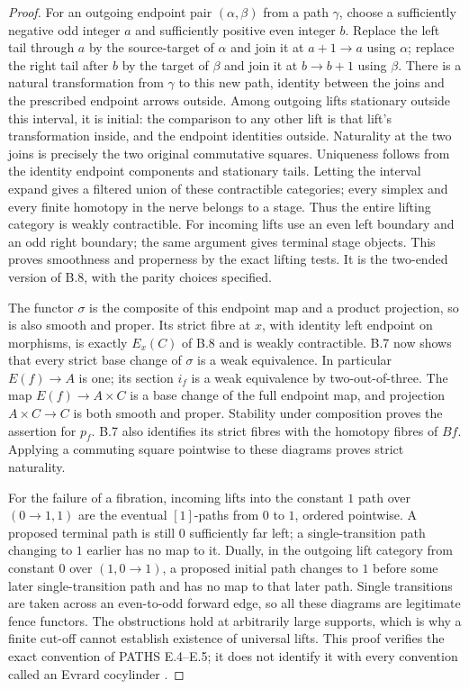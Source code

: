 \begin{proof}
For an outgoing endpoint pair $(\alpha,\beta)$ from a path $\gamma$,
choose a sufficiently negative odd integer $a$ and sufficiently positive
even integer $b$. Replace the left tail through $a$ by the source-target
of $\alpha$ and join it at $a+1\to a$ using $\alpha$; replace the
right tail after $b$ by the target of $\beta$ and join it at $b\to b+1$
using $\beta$. There is a natural transformation from $\gamma$ to this
new path, identity between the joins and the prescribed endpoint arrows
outside. Among outgoing lifts stationary outside this interval, it is
initial: the comparison to any other lift is that lift's transformation
inside, and the endpoint identities outside. Naturality at the two joins
is precisely the two original commutative squares. Uniqueness follows from
the identity endpoint components and stationary tails.
Letting the interval expand gives a filtered union of these contractible
categories; every simplex and every finite homotopy in the nerve belongs
to a stage. Thus the entire lifting category is weakly contractible.
For incoming lifts use an even left boundary and an odd right boundary;
the same argument gives terminal stage objects. This proves smoothness
and properness by the exact lifting tests. It is the two-ended version
of B.8, with the parity choices specified.

The functor $\sigma$ is the composite of this endpoint map and a product
projection, so is also smooth and proper. Its strict fibre at $x$, with
identity left endpoint on morphisms, is exactly $E_x(C)$ of B.8 and is
weakly contractible. B.7 now shows that every strict base change of
$\sigma$ is a weak equivalence. In particular $E(f)\to A$ is one;
its section $i_f$ is a weak equivalence by two-out-of-three.
The map $E(f)\to A\times C$ is a base change of the full endpoint map,
and projection $A\times C\to C$ is both smooth and proper. Stability
under composition proves the assertion for $p_f$. B.7 also identifies
its strict fibres with the homotopy fibres of $Bf$. Applying a commuting
square pointwise to these diagrams proves strict naturality.

For the failure of a fibration, incoming lifts into the constant $1$ path
over $(0\to1,1)$ are the eventual $[1]$-paths from $0$ to $1$, ordered
pointwise. A proposed terminal path is still $0$ sufficiently far left;
a single-transition path changing to $1$ earlier has no map to it.
Dually, in the outgoing lift category from constant $0$ over
$(1,0\to1)$, a proposed initial path changes to $1$ before some
later single-transition path and has no map to that later path.
Single transitions are taken across an even-to-odd forward edge, so all
these diagrams are legitimate fence functors. The obstructions hold at
arbitrarily large supports, which is why a finite cut-off cannot establish
existence of universal lifts. This proof verifies the exact convention of
PATHS E.4--E.5; it does not identify it with every convention called an
Evrard cocylinder \citep{BCEvrard1975}.
\end{proof}

